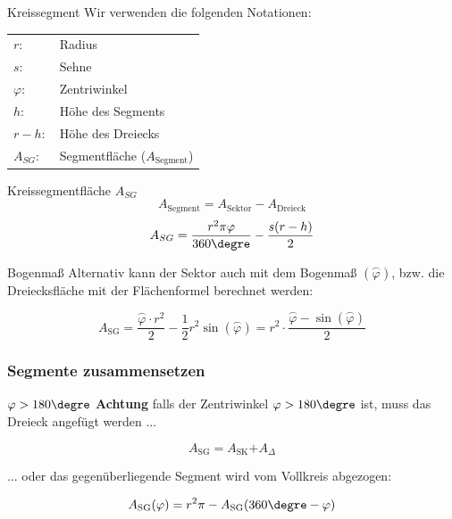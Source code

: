 \begin{definition}{Kreissegment}{}
  Wir verwenden die folgenden Notationen:
  \begin{tabular}{ll}
    $r:$        & Radius \\
    $s:$        & Sehne  \\
    $\varphi: $ & Zentriwinkel \\
    $h:$        & Höhe des Segments\\
    $r-h:$      & Höhe des Dreiecks \\
    $A_{SG}:$    & Segmentfläche ($A_{\text{Segment}}$)
    \end{tabular}  
\end{definition}

\begin{gesetz}{Kreissegmentfläche $A_{SG}$}{}
  $$A_{\text{Segment}} = A_{\text{Sektor}} - A_{\text{Dreieck}}$$
  $$A_{SG} = \frac{r^2\pi\varphi}{360\degre} - \frac{s(r-h)}{2}$$
\end{gesetz}

\begin{bemerkung}{Bogenmaß}{}
  Alternativ kann der Sektor auch mit dem Bogenmaß $(\stackrel{\frown}{\varphi})$, bzw. die
  Dreiecksfläche mit der Flächenformel berechnet werden:

  $$A_{\text{SG}} = \frac{\stackrel{\frown}{\varphi}\cdot{} r^2}2 -
  \frac12 r^2  \sin(\stackrel{\frown}{\varphi}) = r^2 \cdot{}
  \frac{\stackrel{\frown}{\varphi} - \sin(\stackrel{\frown}{\varphi})}{2}$$
\end{bemerkung}

\newpage


\subsubsection{Segmente zusammensetzen}

\begin{bemerkung}{$\varphi>180\degre$}{}
\textbf{Achtung} falls der Zentriwinkel $\varphi > 180\degre$ ist, muss
das Dreieck angefügt werden ...


$$A_{\text{SG}} = A_{\text{SK}} \textbf{+} A_{\Delta}$$

... oder das gegenüberliegende Segment wird vom Vollkreis abgezogen:



$$A_{\text{SG}}(\varphi) = r^2\pi - A_{\text{SG}}(360\degre -\varphi)$$

\end{bemerkung}




